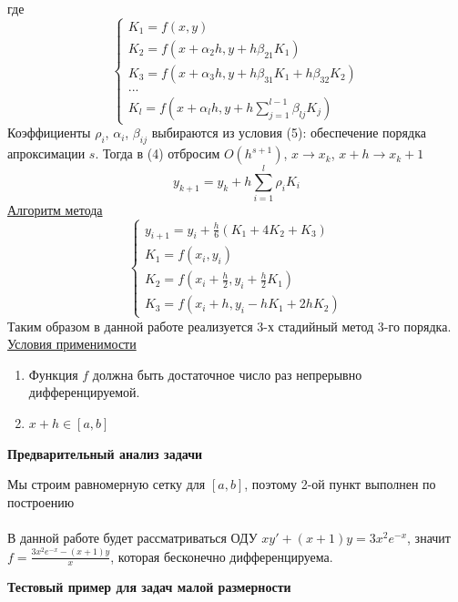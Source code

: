 \documentclass{article}
\begin{document}
	где 
	\begin{equation}
		\begin{cases}
			K_1 = f(x,y)\\
			K_2 = f(x + \alpha_2h,y + h\beta_{21}K_1)\\
			K_3 = f(x + \alpha_3h,y + h\beta_{31}K_1 + h\beta_{32}K_2)\\
			...\\
			\displaystyle K_l = f(x + \alpha_lh, y + h\sum_{j=1}^{l-1}\beta_{lj}K_j)
		\end{cases}	
	\end{equation}
	Коэффициенты $\rho_i$, $\alpha_i$, $\beta_{ij}$ выбираются из условия (5): обеспечение порядка апроксимации $s$.
	Тогда в (4) отбросим $O(h^{s+1})$, $x \rightarrow x_k$, $x+h \rightarrow x_k+1$
	\begin{equation}
		y_{k+1} = y_k + h\sum_{i=1}^{l}\rho_iK_i
	\end{equation}
	\underline{Алгоритм метода}\\
	\begin{equation}
		\begin{cases}
			y_{i+1} = y_i + \frac{h}{6}(K_1 + 4K_2 + K_3)\\
			K_1 = f(x_i, y_i)\\
			K_2 = f(x_i + \frac{h}{2}, y_i + \frac{h}{2}K_1)\\
			K_3 = f(x_i + h, y_i - hK_1 + 2hK_2)
		\end{cases}	
	\end{equation}
	Таким образом в данной работе реализуется 3-х стадийный метод 3-го порядка.\\
	\underline{Условия применимости}
	\begin{enumerate}
		\item Функция $f$ должна быть достаточное число раз непрерывно дифференцируемой.
		\item $x+h \in [a,b]$
	\end{enumerate}
	\begin{center} \textbf{Предварительный анализ задачи}\end{center}
	Мы строим равномерную сетку для $[a,b]$, поэтому  2-ой пункт выполнен по построению\\
	\\
	В данной работе будет рассматриваться ОДУ $xy' + (x+1)y = 3x^2e^{-x}$, значит $\displaystyle f = \frac{3x^2e^{-x} - (x+1)y}{x}$, которая бесконечно дифференцируема.
	\begin{center} \textbf{Тестовый пример для задач малой размерности}\end{center}
\end{document}
